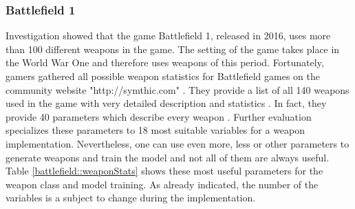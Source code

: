 \documentclass[MGS,Master,english]{twbook}%
\begin{document}
\subsubsection{Battlefield 1}
Investigation showed that the game Battlefield 1, released in 2016, uses more than 100 different weapons in the game. The setting of the game takes place in the World War One and therefore uses weapons of this period. Fortunately, gamers gathered all possible weapon statistics for Battlefield games on the community website "http://symthic.com" \cite{symthic::bf1stats}. They provide a list of all 140 weapons used in the game with very detailed description and statistics \cite{symthic::bf1stats}. In fact, they provide 40 parameters which describe every weapon \cite{symthic::bf1stats}. Further evaluation specializes these parameters to 18 most suitable variables for a weapon implementation. Nevertheless, one can use even more, less or other parameters to generate weapons and train the model and not all of them are always useful. Table \ref{battlefield::weaponStats} shows these most useful parameters for the weapon class and model training. As already indicated, the number of the variables is a subject to change during the implementation.
\end{document}
